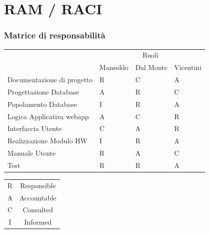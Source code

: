 \documentclass[a4paper,12pt]{beamer}
\begin{document}
\section{RAM / RACI}
\begin{frame}
\frametitle{Matrice di responsabilità}
\begin{table}[ht]
\begin{center}
\begin{tabular}{l | l | l | l}
\rowcolor{Ash}
\hline
\multicolumn{1}{ c |}{\multirow{2}{*}{Attività}}      & \multicolumn{3}{c}{Ruoli} \\ \cline{2-4}
\rowcolor{Ash}
  							    & Mansoldo & Dal Monte & Vicentini \\ \hline
 Documentazione di progetto & R & C & A \\ \hline
 Progettazione Database	    & A & R & C \\ \hline
 Popolamento Database	    & I  & R & A \\ \hline
 Logica Applicativa webapp   & A & C & R \\ \hline
 Interfaccia Utente			    & C & A & R \\ \hline
 Realizzazione Modulo HW   & I  & R &  A \\ \hline
 Manuale Utente			    & R & A & C \\ \hline
 Test						    & R & R & A \\ 
\hline
\end{tabular}
\end{center}
\end{table}


\begin{table}[ht]
\begin{center}
\begin{tabular}{c | c}
\hline
R & Responsible \\
A & Accountable \\
C & Consulted \\
I  & Informed \\ \hline
\end{tabular}
\end{center}
\end{table}
\end{frame}

\pagebreak
\end{document}
